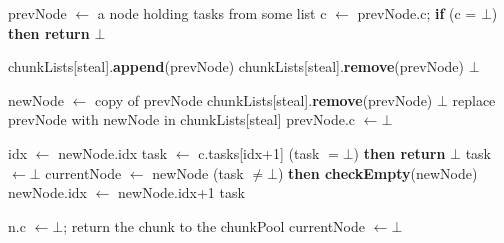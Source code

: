 \begin{algo}[!ht]
\begin{minipage}[t]{0.48\textwidth}
\begin{distribalgo}[1]
	\STATE prevNode $\leftarrow$ a node holding tasks from some list 
	\STATE c $\leftarrow$ prevNode.c; {\bf if} (c = $\bot$) {\bf then return} $\bot$

	\STATE chunkLists[steal].{\bf append}(prevNode) 
 		\STATE chunkLists[steal].{\bf remove}(prevNode)
 		 $\bot$ 
	\ENDINDENT

	\smallskip
	\STATE newNode $\leftarrow$ copy of prevNode
	  \STATE chunkLists[steal].{\bf remove}(prevNode)
	   $\bot$
	\ENDINDENT
	\STATE replace prevNode with newNode in chunkLists[steal]
	\STATE prevNode.c $\leftarrow \bot$ 
	
	\smallskip
	\STATE idx $\leftarrow$ newNode.idx
	\STATE task $\leftarrow$ c.tasks[idx+1] 
	 (task $= \bot$) {\bf then return} $\bot$ 
		\STATE task $\leftarrow \bot$
	\ENDINDENT
	\STATE currentNode $\leftarrow$ newNode
	 (task $\neq \bot$) {\bf then checkEmpty}(newNode)
	\STATE newNode.idx $\leftarrow$ newNode.idx+1
	 task
\ENDINDENT


\medskip

  	\STATE n.c $\leftarrow \bot$; return the chunk to the chunkPool
  	\STATE currentNode $\leftarrow \bot$
  \ENDINDENT
\ENDINDENT

\setcounter{alg:non-fifo:lines}{\value{ALC@line}}
\end{distribalgo}
\end{minipage}
\end{algo}


